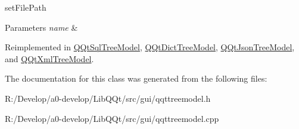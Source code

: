 set\+File\+Path 


\begin{DoxyParams}{Parameters}
{\em name} & \\
\hline
\end{DoxyParams}


Reimplemented in \mbox{\hyperlink{class_q_qt_sql_tree_model_ac1e2c11eda3698560b9e794a8d37c9fc}{Q\+Qt\+Sql\+Tree\+Model}}, \mbox{\hyperlink{class_q_qt_dict_tree_model_a5770f3ffdba4901cbc0f521fd930c1c1}{Q\+Qt\+Dict\+Tree\+Model}}, \mbox{\hyperlink{class_q_qt_json_tree_model_a5fe67b3b54a3f8c067fdb9ccdb84e553}{Q\+Qt\+Json\+Tree\+Model}}, and \mbox{\hyperlink{class_q_qt_xml_tree_model_a66f2bb18d1af1ce2df8f22cad0bc5120}{Q\+Qt\+Xml\+Tree\+Model}}.



The documentation for this class was generated from the following files\+:\begin{DoxyCompactItemize}
\item 
R\+:/\+Develop/a0-\/develop/\+Lib\+Q\+Qt/src/gui/qqttreemodel.\+h\item 
R\+:/\+Develop/a0-\/develop/\+Lib\+Q\+Qt/src/gui/qqttreemodel.\+cpp\end{DoxyCompactItemize}
